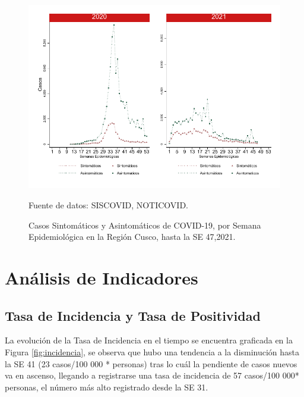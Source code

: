 \documentclass[12pt,a4paper,openany]{book}
\begin{document}
 
\begin{figure}[h]
	\caption{Casos Sintomáticos y Asintomáticos de COVID-19, por Semana Epidemiológica en la Región Cusco, hasta la SE 47,2021.  }\label{fig:sintomaticos_asintomati}
	
	\begin{center}
		\includegraphics[width=0.75\linewidth]{../figuras/sintomaticos_20_21.pdf}
	\end{center}
	{\footnotesize {Fuente de datos: SISCOVID, NOTICOVID.}}
\end{figure}
\clearpage


\clearpage

    \section*{Análisis de Indicadores}
   	\subsection*{Tasa de Incidencia y Tasa de Positividad}
\noindent La evolución de la Tasa de Incidencia en el tiempo se encuentra graficada en la Figura \ref{fig:incidencia}, se observa que hubo una tendencia a la disminución hasta la SE 41 (23 casos/100 000 * personas) tras lo cuál la pendiente de casos nuevos va en ascenso, llegando a registrarse una tasa de incidencia de 57 casos/100 000* personas, el número más alto registrado desde la SE 31.
\end{document}
